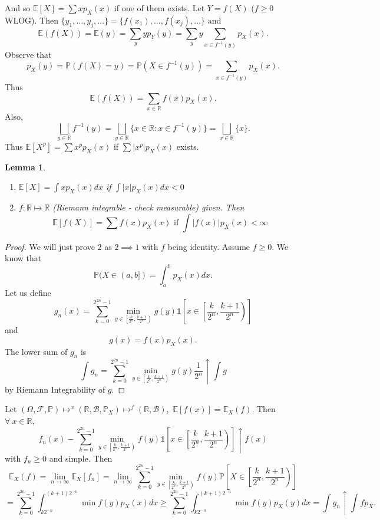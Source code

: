 \documentclass{article}
\newcommand{\1}{\mathds{1}}
\newcommand{\R}{\mathbb{R}}
\newcommand{\E}{\mathbb{E}}
\newcommand{\F}{\mathcal{F}}
\newcommand{\B}{\mathcal{B}}
\newcommand{\PB}{\mathbb{P}}
\newcommand{\lf}{\left}
\newcommand{\rg}{\right}
\newcommand{\f}[2]{\frac{#1}{#2}}
\newcommand{\tb}[1]{\lf[#1\rg]}
\newcommand{\card}[1]{\lf\vert #1\rg\vert}
\newtheorem{lemma}[theorem]{Lemma}
\begin{document}
And so $\E[X]=\sum xp_X(x)$ if one of them exists.
Let $Y=f(X)$ ($f\geq 0$ WLOG). Then $\{y_1,\ldots,y_j,\ldots\}=\{f(x_1),\ldots,f(x_j),\ldots\}$ and $$\E(f(X))=\E(y)=\sum_yyp_Y(y)=\sum_yy\sum_{x\in f^{-1}(y)}p_X(x).$$ Observe that
$$p_X(y)=\PB(f(X)=y)=\PB(X\in f^{-1}(y))=\sum_{x\in f^{-1}(y)}p_X(x).$$ Thus $$\E(f(X))=\sum_{x\in\R}f(x)p_X(x).$$ Also, $$\bigsqcup_{y\in\R}f^{-1}(y)=\bigsqcup_{y\in\R}\{x\in\R:x\in f^{-1}(y)\}=\bigsqcup_{x\in\R}\{x\}.$$
Thus $\E[X^p]=\sum x^pp_X(x)$ if $\sum \card{x^p}p_X(x)$ exists. 
\begin{lemma}
    \begin{enumerate}
        \item $\E[X]=\int xp_X(x)dx$ if $\int\card{x}p_X(x)dx<0$
        \item $f:\R\mapsto\R$ (Riemann integrable - check measurable) given. Then $$\E[f(X)]=\sum f(x)p_X(x)\text{ if }\int\card{f(x)}p_X(x)<\infty$$
    \end{enumerate}
\end{lemma}
\begin{proof}
    We will just prove $2$ as $2\implies 1$ with $f$ being identity. Assume $f\geq 0.$ We know that $$\PB(X\in (a,b])=\int_a^bp_X(x)dx.$$ Let us define $$g_n(x)=\sum_{k=0}^{2^{2n}-1}\min_{y\in\lf[\f k{2^n},\f{k+1}{2^n}\rg)}g(y)\1\tb{x\in\lf[\f k{2^n},\f{k+1}{2^n}\rg)}$$ and $$g(x)=f(x)p_X(x).$$ The lower sum of $g_n$ is $$\int g_n=\sum_{k=0}^{2^{2n}-1}\min_{y\in\lf[\f k{2^n},\f{k+1}{2^n}\rg)}g(y)\f1{2^n}\uparrow\int g$$ by Riemann Integrability of $g.$ 
\end{proof}
Let $(\Omega,\F,\PB)\mapsto^x(\R,\B,\PB_X)\mapsto^f (\R,\B),$ $\E[f(x)]=\E_X(f).$ Then $\forall\ x\in\R,$ $$f_n(x)-\sum_{k=0}^{2^{2n}-1}\min_{y\in\lf[\f k{2^n},\f{k+1}{2^n}\rg)}f(y)\1\tb{x\in\lf[\f k{2^n},\f{k+1}{2^n}\rg)}\uparrow f(x)$$ with $f_n\geq 0$ and simple. Then $$\E_X(f)=\lim_{n\to\infty}\E_X[f_n]=\lim_{n\to\infty}\sum_{k=0}^{2^{2n}-1}\min_{y\in\lf[\f k{2^n},\f{k+1}{2^n}\rg)}f(y)\PB\tb{X\in\lf[\f k{2^n},\f{k+1}{2^n}\rg)}$$ $$=\sum_{k=0}^{2^{2n}-1}\int_{k2^{-n}}^{(k+1)2^{-n}}\min_{}f(y)p_X(x)dx\geq \sum_{k=0}^{2^{2n}-1}\int_{k2^{-n}}^{(k+1)2^{-n}}\min_{}f(y)p_X(y)dx=\int g_n\uparrow \int fp_X.$$ 
\end{document}
